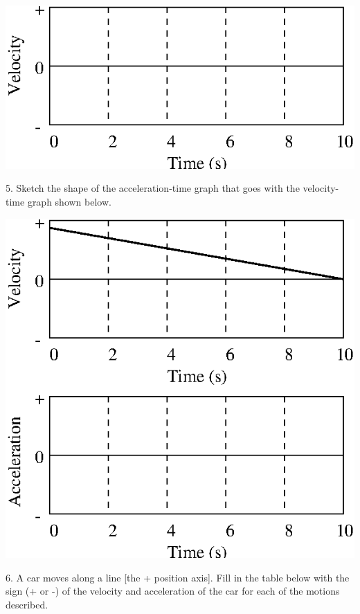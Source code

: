 \vspace{0.3cm}
{\par\centering \includegraphics{slowing/slowing_fig9.eps} \par}
\vspace{0.3cm}

5. Sketch the shape of the acceleration-time graph that goes with the velocity-time
graph shown below.

\vspace{0.3cm}
{\par\centering \includegraphics{slowing/slowing_fig10.eps} \par}
\vspace{0.3cm}

6. A car moves along a line {[}the + position axis{]}. Fill in the table below
with the sign (+ or -) of the velocity and acceleration of the car for each
of the motions described.

